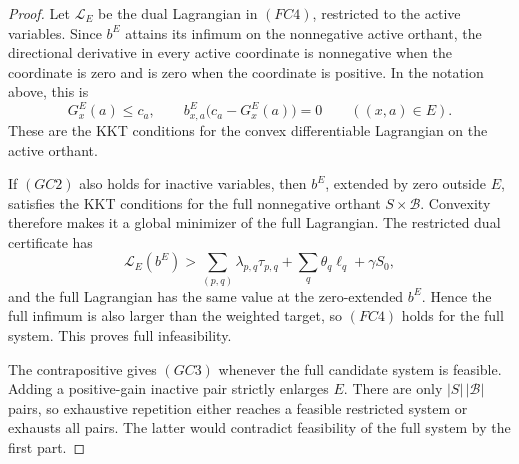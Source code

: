 \documentclass[10pt]{article}
\theoremstyle{definition}
\begin{document}
\begin{proof}
   Let \(\mathcal L_E\) be the dual Lagrangian in \((FC4)\), restricted to the
   active variables.  Since \(b^E\) attains its infimum on the nonnegative active
   orthant, the directional derivative in every active coordinate is
   nonnegative when the coordinate is zero and is zero when the coordinate is
   positive.  In the notation above, this is
   \[
      G_x^E(a)\le c_a,\qquad
      b^E_{x,a}\bigl(c_a-G_x^E(a)\bigr)=0
      \qquad((x,a)\in E).
      \tag{GC4}
   \]
   These are the KKT conditions for the convex differentiable Lagrangian on the
   active orthant.

   If \((GC2)\) also holds for inactive variables, then \(b^E\), extended by
   zero outside \(E\), satisfies the KKT conditions for the full nonnegative
   orthant \(S\times\mathcal B\).  Convexity therefore makes it a global
   minimizer of the full Lagrangian.  The restricted dual certificate has
   \[
      \mathcal L_E(b^E)>
      \sum_{(p,q)}\lambda_{p,q}\tau_{p,q}
      +\sum_q\theta_q\ell_q+\gamma S_0 ,
   \]
   and the full Lagrangian has the same value at the zero-extended \(b^E\).
   Hence the full infimum is also larger than the weighted target, so
   \((FC4)\) holds for the full system.  This proves full infeasibility.

   The contrapositive gives \((GC3)\) whenever the full candidate system is
   feasible.  Adding a positive-gain inactive pair strictly enlarges \(E\).
   There are only \(|S|\,|\mathcal B|\) pairs, so exhaustive repetition either
   reaches a feasible restricted system or exhausts all pairs.  The latter would
   contradict feasibility of the full system by the first part.
\end{proof}
\end{document}
